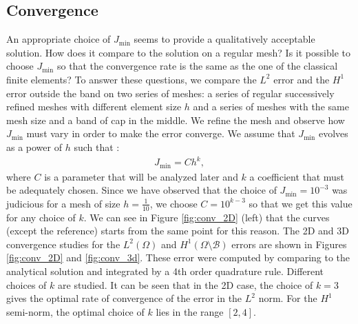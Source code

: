 \documentclass{article}
\theoremstyle{remark}
\def\B{\mathcal{B}}
\newcommand{\Jmin}{J_{\text{min}}}
\begin{document}
\subsection{Convergence}
An appropriate choice of $\Jmin$ seems to provide a qualitatively acceptable solution. How does it compare to the solution on a regular mesh?
Is it possible to choose $\Jmin$ so that the convergence rate is the same as the one of the classical finite elements?
To answer these questions, we compare the $L^2$ error and the $H^1$ error outside the band  on two series of meshes: a series of regular successively refined meshes with different element size $h$ and a series of meshes with the same mesh size and a band of cap in the middle.  
We refine the mesh and observe how $\Jmin$ must vary in order to make the error converge. We assume that $\Jmin$ evolves as a power of $h$ such that :
\begin{align*}
    \Jmin = C h^k,
\end{align*}
where $C$ is a parameter that will be analyzed later and $k$ a coefficient that must be adequately chosen. 
Since we have observed that the choice of $\Jmin=10^{-3}$ was judicious for a mesh of size $h=\frac{1}{10}$, we choose $C = 10^{k-3}$ so that we get this value for any choice of $k$. We can see in Figure \ref{fig:conv_2D} (left) that the curves (except the reference) starts from the same point for this reason.
The 2D and 3D convergence studies for the $L^2(\Omega)$ and $H^1(\Omega \setminus \B)$ errors are shown  in Figures \ref{fig:conv_2D} and \ref{fig:conv_3d}. These error were computed by comparing to the analytical solution and integrated by a 4th order quadrature rule. Different choices of $k$ are studied. It can be seen that in the 2D case, the choice of $k=3$ gives the optimal rate of convergence of the error in the $L^2$ norm. For the $H^1$ semi-norm, the optimal choice of $k$ lies  in the range $[2,4]$. 
\end{document}
